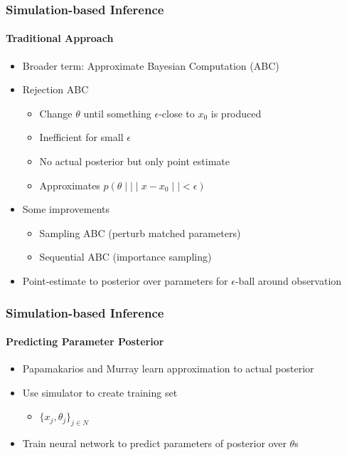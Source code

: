 \documentclass[9pt, aspectratio=169]{beamer}
\begin{document}
\begin{frame}
\frametitle{Simulation-based Inference}
\framesubtitle{Traditional Approach}
\begin{itemize}
	\item Broader term: Approximate Bayesian Computation (ABC)
		\item Rejection ABC
		\begin{itemize}
				\item Change $\theta$ until something $\epsilon$-close to $x_0$ is produced
				\item Inefficient for small $\epsilon$
				\item No actual posterior but only point estimate
				\item Approximates $p(\theta\mid\mid\mid x-x_0 \mid\mid < \epsilon)$
		\end{itemize}
	\item Some improvements
	\begin{itemize}
		\item Sampling ABC (perturb matched parameters) \cite{marjoram2003markov}
		\item Sequential ABC (importance sampling) \cite{beaumont2009adaptive,bonassi2015sequential}
	\end{itemize}
	\item Point-estimate to posterior over parameters for $\epsilon$-ball around observation
	
\end{itemize}
\end{frame} 



\begin{frame}
\frametitle{Simulation-based Inference}
\framesubtitle{Predicting Parameter Posterior}
\begin{itemize}
	\item Papamakarios and Murray \cite{papamakarios2016fast} learn approximation to actual posterior
	\item Use simulator to create training set
	\begin{itemize}
		\item $\lbrace x_j, \theta_j \rbrace_{j \in N}$
	\end{itemize}
	\item Train neural network to predict parameters of posterior over $\theta$s 
\end{itemize}
\end{frame} 
\end{document}
